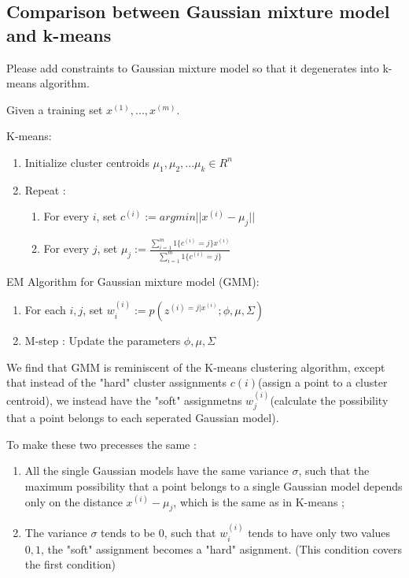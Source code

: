 \documentclass{article}
\newenvironment{answer}{\par\color{ForestGreen}}{\par}
\begin{document}
\subsection{Comparison between Gaussian mixture model and k-means}
Please add constraints to Gaussian mixture model so that it degenerates into k-means algorithm.
\begin{answer}

Given a training set ${x^{(1)},...,x^{(m)}}$.

K-means:
\begin{enumerate}
  \item Initialize cluster centroids $\mu_1, \mu_2,...\mu_k \in R^n$
  \item Repeat :
   \begin{enumerate}
    \item For every $i$, set $c^{(i)} := arg min ||x^{(i)} - \mu_j||$
    \item For every $j$, set $\mu_j := \frac{\sum_{i=1}^m1\{c^{(i)} = j\}x^{(i)}}{\sum_{i=1}^m1\{c^{(i)} = j\}}$
    \end{enumerate}
\end{enumerate}

EM Algorithm for Gaussian mixture model (GMM):
\begin{enumerate}
  \item For each $i,j$, set $w_i^{(i)} :=p(z^{(i) = j|x^{(i)}};\phi, \mu,\Sigma)$
  \item M-step : Update the parameters $\phi, \mu,\Sigma$
\end{enumerate}


We find that GMM is reminiscent of the K-means clustering algorithm, except that instead of the "hard" cluster assignments $c(i)$(assign a point to a cluster centroid), we instead have the "soft" assignmetns $w_j^{(i)}$(calculate the possibility that a point belongs to each seperated Gaussian model).

To make these two precesses the same :
\begin{enumerate}
  \item All the single Gaussian models have the same variance $\sigma$, such that the maximum possibility that a point belongs to a single Gaussian model  depends only on the distance $x^{(i)} - \mu_j$, which is the same as in K-means ;
  \item The variance $\sigma$ tends to be $0$, such that $w_i^{(i)}$ tends to have only two values $0, 1$, the "soft" assignment becomes a "hard" asignment. (This condition covers the first condition)
\end{enumerate}

\end{answer}
\end{document}
